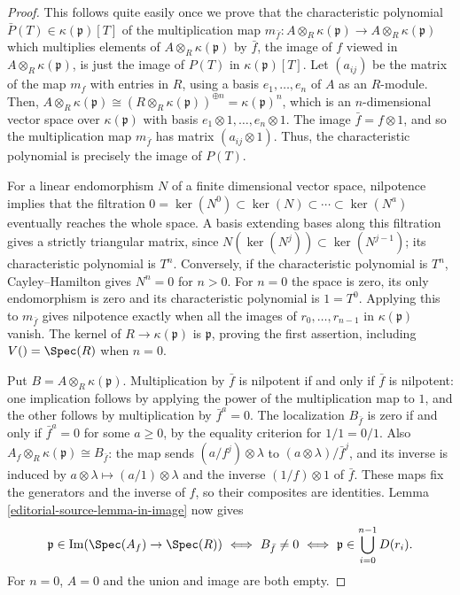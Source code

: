 \begin{proof}
This follows quite easily once we prove that the characteristic
polynomial $\bar P(T) \in \kappa(\mathfrak p)[T]$ of the
multiplication map $m_{\bar f}: A \otimes_R \kappa(\mathfrak p) \to
A \otimes_R \kappa(\mathfrak p)$ which multiplies elements of $A
\otimes_R \kappa(\mathfrak p)$ by $\bar f$, the image of $f$ viewed in
$A\otimes_R\kappa(\mathfrak p)$, is just the image of $P(T)$ in
$\kappa(\mathfrak p)[T]$. Let $(a_{ij})$ be the matrix of the map
$m_f$ with entries in $R$, using a basis $e_1, \ldots, e_n$
of $A$ as an $R$-module.
Then, $A \otimes_R \kappa(\mathfrak p) \cong (R \otimes_R
\kappa(\mathfrak p))^{\oplus n} = \kappa(\mathfrak p)^n$, which is
an $n$-dimensional vector space over $\kappa(\mathfrak p)$ with
basis $e_1 \otimes 1, \ldots, e_n \otimes 1$. The image $\bar f = f
\otimes 1$, and so the multiplication map $m_{\bar f}$ has matrix
$(a_{ij} \otimes 1)$. Thus, the characteristic polynomial is
precisely the image of $P(T)$.

\medskip\noindent
For a linear endomorphism $N$ of a finite dimensional vector space,
nilpotence implies that the filtration
$0=\ker(N^0)\subset\ker(N)\subset\cdots\subset\ker(N^a)$
eventually reaches the whole space. A basis extending bases along this
filtration gives a strictly triangular matrix, since
$N(\ker(N^j))\subset\ker(N^{j-1})$; its characteristic polynomial
is $T^n$. Conversely, if the characteristic polynomial is $T^n$,
Cayley--Hamilton gives $N^n=0$ for $n>0$.
For $n=0$ the space is zero, its only endomorphism is zero and its
characteristic polynomial is $1=T^0$. Applying this to $m_{\bar f}$
gives nilpotence exactly when all the images of
$r_0,\ldots,r_{n-1}$ in $\kappa(\mathfrak p)$ vanish.
The kernel of $R\to\kappa(\mathfrak p)$ is $\mathfrak p$, proving
the first assertion, including $V()=\Spec(R)$ when $n=0$.

\medskip\noindent
Put $B=A\otimes_R\kappa(\mathfrak p)$. Multiplication by $\bar f$
is nilpotent if and only if $\bar f$ is nilpotent: one implication
follows by applying the power of the multiplication map to $1$, and
the other follows by multiplication by $\bar f^a=0$.
The localization $B_{\bar f}$ is zero if and only if
$\bar f^a=0$ for some $a\geq0$, by the equality criterion for
$1/1=0/1$. Also
$A_f\otimes_R\kappa(\mathfrak p)\cong B_{\bar f}$:
the map sends $(a/f^j)\otimes\lambda$ to
$(a\otimes\lambda)/\bar f^j$, and its inverse is induced by
$a\otimes\lambda\mapsto(a/1)\otimes\lambda$ and the inverse
$(1/f)\otimes1$ of $\bar f$. These maps fix the generators and
the inverse of $f$, so their composites are identities.
Lemma \ref{editorial-source-lemma-in-image} now gives
$$
\mathfrak p\in\operatorname{Im}(\Spec(A_f)\to\Spec(R))
\ \Longleftrightarrow\ B_{\bar f}\ne0
\ \Longleftrightarrow\ \mathfrak p\in\bigcup_{i=0}^{n-1}D(r_i).
$$
For $n=0$, $A=0$ and the union and image are both empty.


\end{proof}
